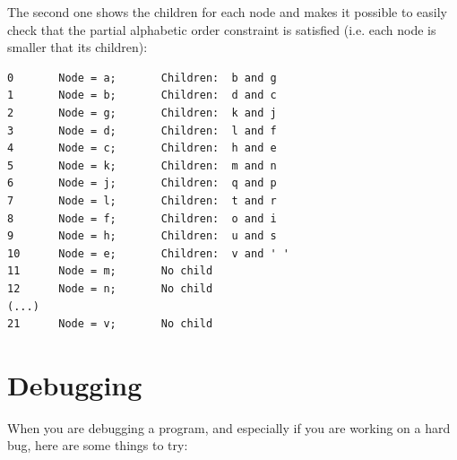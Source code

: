 The second one shows the children for each node and makes it 
possible to easily check that the partial alphabetic order 
constraint is satisfied (i.e. each node is smaller that its 
children):

\begin{verbatim}
0       Node = a;       Children:  b and g
1       Node = b;       Children:  d and c
2       Node = g;       Children:  k and j
3       Node = d;       Children:  l and f
4       Node = c;       Children:  h and e
5       Node = k;       Children:  m and n
6       Node = j;       Children:  q and p
7       Node = l;       Children:  t and r
8       Node = f;       Children:  o and i
9       Node = h;       Children:  u and s
10      Node = e;       Children:  v and ' '
11      Node = m;       No child
12      Node = n;       No child
(...)
21      Node = v;       No child
\end{verbatim}



\section{Debugging}

When you are debugging a program, and especially if you are
working on a hard bug, here are some things to try:

